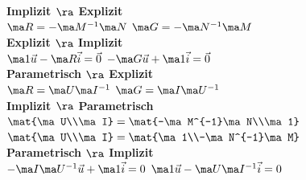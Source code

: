 \documentclass[fs, footer]{latex4ei}
\begin{document}
\begin{multicols*}{4}
{{\begin{tabular}{ccccccc}
		\end{tabular}
}
}
\textbf{Implizit $\ra$ Explizit}\\
$\ma R = -\ma M^{-1}\ma N$\quad
$\ma G = -\ma N^{-1}\ma M$\\
\textbf{Explizit $\ra$ Implizit}\\
$\ma 1 \vec u - \ma R \vec i = \vec 0$\quad
$-\ma G \vec u + \ma 1 \vec i = \vec 0$\\
\textbf{Parametrisch $\ra$ Explizit}\\
$\ma R = \ma U \ma I^{-1}$\quad
$\ma G = \ma I \ma U^{-1}$\\
\textbf{Implizit $\ra$ Parametrisch}\\
$\mat{\ma U\\\ma I} = \mat{-\ma M^{-1}\ma N\\\ma 1}$\quad
$\mat{\ma U\\\ma I} = \mat{\ma 1\\-\ma N^{-1}\ma M}$\\
\textbf{Parametrisch $\ra$ Implizit}\\
$-\ma I \ma U^{-1} \vec u + \ma 1 \vec i = 0$\quad
$\ma 1 \vec u - \ma U \ma I^{-1} \vec i = 0$




\end{multicols*}



\end{document}
